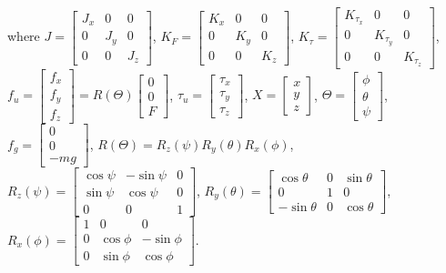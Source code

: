 \documentclass{ieeeaccess}
\begin{document}
where $J=\begin{bmatrix}
    J_{x} & 0 & 0 \\
    0 & J_{y} & 0 \\
    0 & 0 & J_{z}
\end{bmatrix}$, $K_F=\begin{bmatrix}
    K_{x} & 0 & 0 \\
    0 & K_{y} & 0 \\
    0 & 0 & K_{z}
\end{bmatrix}$, $K_\tau=\begin{bmatrix}
    K_{\tau_x} & 0 & 0 \\
    0 & K_{\tau_y} & 0 \\
    0 & 0 & K_{\tau_z}
\end{bmatrix}$, $f_u =\begin{bmatrix}
    f_x \\ f_y \\ f_z
\end{bmatrix} = R(\Theta)\begin{bmatrix}
    0 \\ 0 \\ F
\end{bmatrix}$, $\tau_u=\begin{bmatrix}
    \tau_x \\ \tau_y \\ \tau_z
\end{bmatrix}$, $X=\begin{bmatrix}
    x \\ y \\ z
\end{bmatrix}$, $\Theta=\begin{bmatrix}
    \phi \\ \theta \\ \psi
\end{bmatrix}$, $f_g=\begin{bmatrix}
    0 \\ 0 \\ -mg
\end{bmatrix}$, $R(\Theta)=R_z(\psi)R_y(\theta)R_x(\phi)$, $R_z(\psi)=\begin{bmatrix} %
    \cos\psi & -\sin\psi & 0 \\
    \sin\psi & \cos\psi & 0 \\
    0 & 0 & 1
\end{bmatrix}$, $R_y(\theta)=\begin{bmatrix}
    \cos\theta & 0 & \sin\theta \\
    0 & 1 & 0 \\
    -\sin\theta & 0 & \cos\theta
\end{bmatrix}$, $R_x(\phi)=\begin{bmatrix}
    1 & 0 & 0 \\
    0 & \cos\phi & -\sin\phi \\
    0 & \sin\phi & \cos\phi
\end{bmatrix}$.
\end{document}
